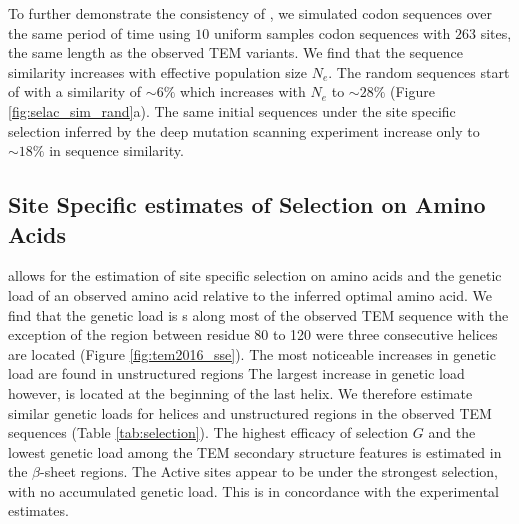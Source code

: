 To further demonstrate the consistency of \selac, we simulated codon sequences over the same period of time using $10$ uniform samples codon sequences with $263$ sites, the same length as the observed TEM variants.
We find that the sequence similarity increases with effective population size $N_e$.
The random sequences start of with a similarity of $\sim6 \%$ which increases with $N_e$ to $\sim28 \%$ (Figure \ref{fig:selac_sim_rand}a).
The same initial sequences under the site specific selection inferred by the deep mutation scanning experiment increase only to $\sim18 \%$ in sequence similarity.



\subsection{Site Specific estimates of Selection on Amino Acids}
\selac allows for the estimation of site specific selection on amino acids and the genetic load of an observed amino acid relative to the inferred optimal amino acid.
We find that the genetic load is s along most of the observed TEM sequence with the exception of the region between residue 80 to 120 were three consecutive helices are located (Figure \ref{fig:tem2016_sse}). 
The most noticeable increases in genetic load are found in unstructured regions
The largest increase in genetic load however, is located at the beginning of the last helix.
We therefore estimate similar genetic loads for helices and unstructured regions in the observed TEM sequences (Table \ref{tab:selection}).
The highest efficacy of selection $G$ and the lowest genetic load among the TEM secondary structure features is estimated in the $\beta$-sheet regions.
The Active sites appear to be under the strongest selection, with no accumulated genetic load.
This is in concordance with the experimental estimates.

